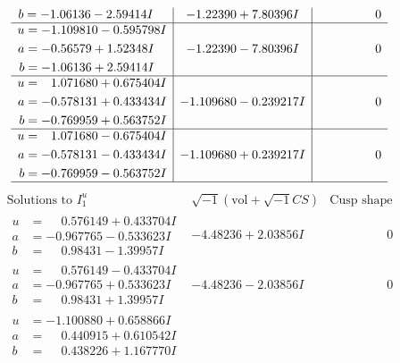 \documentclass[1p]{elsarticle_modified}
\theoremstyle{definition}
\newcommand{\I}{\sqrt{-1}}
\begin{document}
$$\begin{array}{c|c|c}
\begin{aligned}
b &= -1.06136 - 2.59414 I\end{aligned}
 & -1.22390 + 7.80396 I & \phantom{-0.000000 } 0 \\ \hline\begin{aligned}
u &= -1.109810 - 0.595798 I \\
a &= -0.56579 + 1.52348 I \\
b &= -1.06136 + 2.59414 I\end{aligned}
 & -1.22390 - 7.80396 I & \phantom{-0.000000 } 0 \\ \hline\begin{aligned}
u &= \phantom{-}1.071680 + 0.675404 I \\
a &= -0.578131 + 0.433434 I \\
b &= -0.769959 + 0.563752 I\end{aligned}
 & -1.109680 - 0.239217 I & \phantom{-0.000000 } 0 \\ \hline\begin{aligned}
u &= \phantom{-}1.071680 - 0.675404 I \\
a &= -0.578131 - 0.433434 I \\
b &= -0.769959 - 0.563752 I\end{aligned}
 & -1.109680 + 0.239217 I & \phantom{-0.000000 } 0\\
 \hline 
 \end{array}$$\newpage$$\begin{array}{c|c|c}  
\text{Solutions to }I^u_{1}& \I (\text{vol} + \sqrt{-1}CS) & \text{Cusp shape}\\
 \hline 
\begin{aligned}
u &= \phantom{-}0.576149 + 0.433704 I \\
a &= -0.967765 - 0.533623 I \\
b &= \phantom{-}0.98431 - 1.39957 I\end{aligned}
 & -4.48236 + 2.03856 I & \phantom{-0.000000 } 0 \\ \hline\begin{aligned}
u &= \phantom{-}0.576149 - 0.433704 I \\
a &= -0.967765 + 0.533623 I \\
b &= \phantom{-}0.98431 + 1.39957 I\end{aligned}
 & -4.48236 - 2.03856 I & \phantom{-0.000000 } 0 \\ \hline\begin{aligned}
u &= -1.100880 + 0.658866 I \\
a &= \phantom{-}0.440915 + 0.610542 I \\
b &= \phantom{-}0.438226 + 1.167770 I\end{aligned}

\end{array}$$
\end{document}
